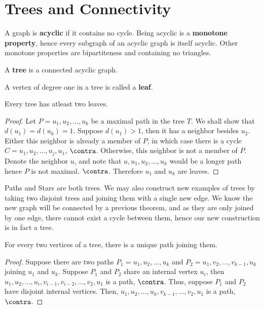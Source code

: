 \section{Trees and Connectivity}

\begin{definition}[Acyclic]
	A graph is \textbf{acyclic} if it contains no cycle. Being acyclic is a \textbf{monotone property}, hence every subgraph of an acyclic graph is itself acyclic. Other monotone properties are bipartiteness and containing no triangles.
\end{definition}
\begin{definition}[Trees]
	A \textbf{tree} is a connected acyclic graph.
\end{definition}
\begin{definition}[Leaves]
	A vertex of degree one in a tree is called a \textbf{leaf}.
\end{definition}
\begin{theorem}
	Every tree has atleast two leaves.
\end{theorem}
\begin{proof}
	Let $P = u_1, u_2, \ldots, u_{k}$ be a maximal path in the tree $T$. We shall show that  $d\left( u_1 \right) = d\left( u_{k} \right) = 1 $. Suppose $d\left( u_1 \right) > 1$, then it has a neighbor besides $u_2$. Either this neighbor is already a member of $P$, in which case there is a cycle $C = u_1, u_2, \ldots, u_{j}, u_1$, $\contra$. Otherwise, this neighbor is not a member of $P$. Denote the neighbor $u$, and note that $u, u_1, u_2, \ldots, u_{k}$ would be a longer path hence $P$ is not maximal. $\contra$. Therefore $u_1$ and $u_{k}$ are leaves.
\end{proof}
\begin{example}
	Paths and Stars are both trees.
	We may also construct new examples of trees by taking two disjoint trees and joining them with a single new edge. We know the new graph will be connected by a previous theorem, and as they are only joined by one edge, there cannot exist a cycle between them, hence our new construction is in fact a tree.
\end{example}
\begin{proposition}
	For every two vertices of a tree, there is a unique path joining them.
\end{proposition}
\begin{proof}
	Suppose there are two paths $P_1 = u_1, u_2, \ldots, u_{k}$ and $P_2 = u_1, v_2, \ldots, v_{k-1}, u_{k}$ joining $u_1$ and $u_{k}$. Suppose $P_1$ and $P_2$ share an internal vertex $u_{i}$, then $u_1, u_2, \ldots, u_{i}, v_{i-1}, v_{i-2}, \ldots, v_2, u_1$ is a path, $\contra $. Thus, suppose $P_1$ and $P_2$ have disjoint internal vertices. Then, $u_1, u_2, \ldots, u_{k}, v_{k-1}, \ldots, v_2, u_1$ is a path, $\contra$.
\end{proof}
